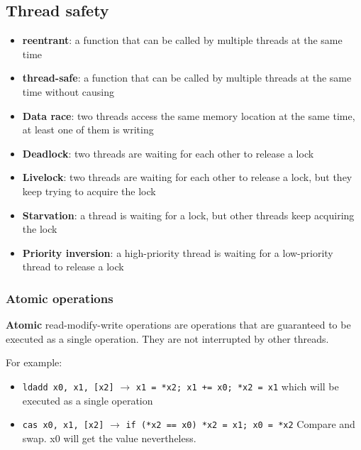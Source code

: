 \documentclass[letterpaper,12pt]{article}
\begin{document}
\subsection{Thread safety}
\begin{itemize}
    \item \textbf{reentrant}: a function that can be called by multiple threads at the same time
    \item \textbf{thread-safe}: a function that can be called by multiple threads at the same time without causing
    \item \textbf{Data race}: two threads access the same memory location at the same time, at least one of them is writing
    \item \textbf{Deadlock}: two threads are waiting for each other to release a lock
    \item \textbf{Livelock}: two threads are waiting for each other to release a lock, but they keep trying to acquire the lock
    \item \textbf{Starvation}: a thread is waiting for a lock, but other threads keep acquiring the lock
    \item \textbf{Priority inversion}: a high-priority thread is waiting for a low-priority thread to release a lock
\end{itemize}
\subsubsection{Atomic operations}
\textbf{Atomic} read-modify-write operations are operations that are guaranteed to be executed as a single operation. They are not interrupted by other threads. 

For example: \begin{itemize}
    \item \texttt{ldadd x0, x1, [x2]} $\to$ \texttt{x1 = *x2; x1 += x0; *x2 = x1} which will be executed as a single operation
    \item \texttt{cas x0, x1, [x2]} $\to$ \texttt{if (*x2 == x0) *x2 = x1; x0 = *x2} Compare and swap. x0 will get the value nevertheless.
\end{itemize}
\end{document}
